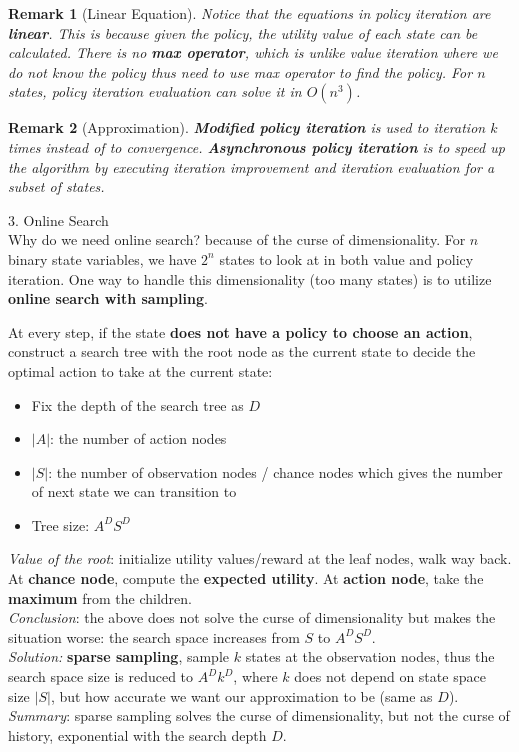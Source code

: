 \documentclass[12pt]{article}
\newtheorem*{remark}{Remark}
\begin{document}
\begin{remark}[Linear Equation]
Notice that the equations in policy iteration are \textbf{linear}. This is because given the policy, the utility value of each state can be calculated. There is no \textbf{max operator}, which is unlike value iteration where we do not know the policy thus need to use max operator to find the policy. For $n$ states, policy iteration evaluation can solve it in $O(n^3)$. 
\end{remark}

\begin{remark}[Approximation]
\textbf{Modified policy iteration} is used to iteration $k$ times instead of to convergence. \textbf{Asynchronous policy iteration} is to speed up the algorithm by executing iteration improvement and iteration evaluation for a subset of states. 
\end{remark}

\noindent
{\large{3. Online Search}}\\
Why do we need online search? because of the curse of dimensionality. For $n$ binary state variables, we have $2^n$ states to look at in both value and policy iteration. One way to handle this dimensionality (too many states) is to utilize \textbf{online search with sampling}.

\begin{tcolorbox}
At every step, if the state \textbf{does not have a policy to choose an action}, construct a search tree with the root node as the current state to decide the optimal action to take at the current state:
\begin{itemize}
\item Fix the depth of the search tree as $D$
\item $|A|$: the number of action nodes 
\item $|S|$: the number of observation nodes / chance nodes which gives the number of next state we can transition to 
\item Tree size: $A^D S^D$
\end{itemize}

\textsl{Value of the root}: initialize utility values/reward at the leaf nodes, walk way back. At \textbf{chance node}, compute the \textbf{expected utility}. At \textbf{action node}, take the \textbf{maximum} from the children. \\

\textsl{Conclusion}: the above does not solve the curse of dimensionality but makes the situation worse: the search space increases from $S$ to $A^D S^D$.\\

\textsl{Solution:} \textbf{sparse sampling}, sample $k$ states at the observation nodes, thus the search space size is reduced to $A^D k^D$, where $k$ does not depend on state space size $|S|$, but how accurate we want our approximation to be (same as $D$).\\

\textsl{Summary}: sparse sampling solves the curse of dimensionality, but not the curse of history, exponential with the search depth $D$. 

\end{tcolorbox}
\end{document}
